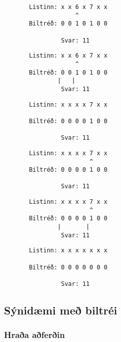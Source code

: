{ \begin{verbatim}
       Listinn: x x 6 x 7 x x
                    ^
       Biltréð: 0 0 1 0 1 0 0

                Svar: 11
\end{verbatim}}
{ \begin{verbatim}
       Listinn: x x 6 x 7 x x
                    ^
       Biltréð: 0 0 1 0 1 0 0
               |   |
                Svar: 11
\end{verbatim}}
{ \begin{verbatim}
       Listinn: x x x x 7 x x

       Biltréð: 0 0 0 0 1 0 0

                Svar: 11
\end{verbatim}}
{ \begin{verbatim}
       Listinn: x x x x 7 x x
                        ^
       Biltréð: 0 0 0 0 1 0 0

                Svar: 11
\end{verbatim}}
{ \begin{verbatim}
       Listinn: x x x x 7 x x
                        ^
       Biltréð: 0 0 0 0 1 0 0
               |       |
                Svar: 11
\end{verbatim}}
{ \begin{verbatim}
       Listinn: x x x x x x x

       Biltréð: 0 0 0 0 0 0 0

                Svar: 11
\end{verbatim}}
\subsection{Sýnidæmi með biltréi}
{
    \frametitle{Hraða aðferðin}
}

